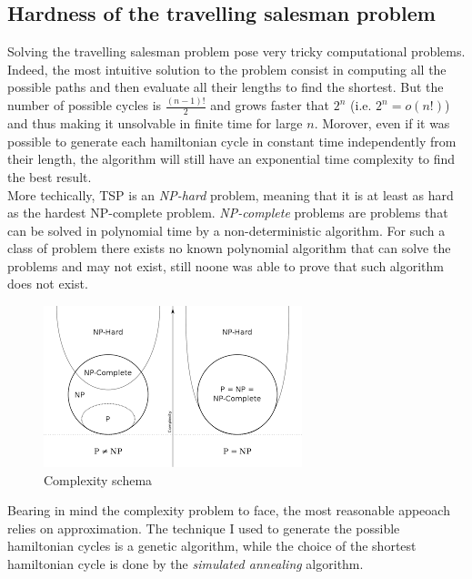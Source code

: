 \documentclass{article}
\begin{document}
\subsection{Hardness of the travelling salesman problem}
Solving the travelling salesman problem pose very tricky computational problems. Indeed, the most intuitive solution to the problem consist in computing all the possible paths and then evaluate all their lengths to find the shortest. But the number of possible cycles is $\frac{(n-1)!}{2}$ and grows faster that $2^n$ (i.e. $2^n = o(n!)$) and thus making it unsolvable in finite time for large $n$. Morover, even if it was possible to generate each hamiltonian cycle in constant time independently from their length, the algorithm will still have an exponential time complexity to find the best result.  \\
More techically, TSP is an \textit{NP-hard} problem, meaning that it is at least as hard as the hardest NP-complete problem. \textit{NP-complete} problems are problems that can be solved in polynomial time by a non-deterministic algorithm. For such a class of problem there exists no known polynomial algorithm that can solve the problems and may not exist, still noone was able to prove that such algorithm does not exist.
\begin{figure}[H]
\includegraphics[scale=0.25]{complexity_classes.png} 
\centering
\caption{Complexity schema}
\end{figure}
\noindent Bearing in mind the complexity problem to face, the most reasonable appeoach relies on approximation. The technique I used to generate the possible hamiltonian cycles is a genetic algorithm, while the choice of the shortest hamiltonian cycle is done by the \textit{simulated annealing} algorithm.
\end{document}

